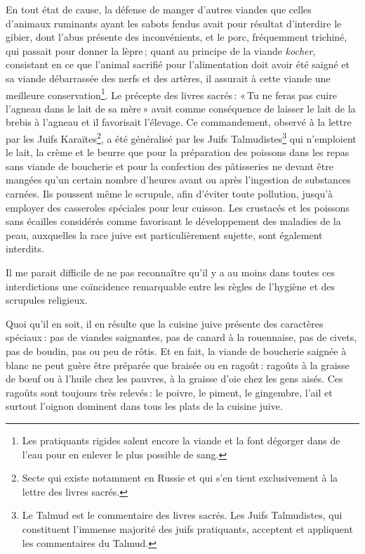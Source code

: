 En tout état de cause, la défense de manger d'autres viandes que celles
d'animaux ruminants ayant les sabots fendus avait pour résultat d'interdire le
gibier, dont l'abus présente des inconvénients, et le porc, fréquemment
trichiné, qui passait pour donner la lèpre ; quant au principe de la viande
\textit{kocher}, consistant en ce que l'animal sacrifié pour l'alimentation
doit avoir été saigné et sa viande débarrassée des nerfs et des artères, il
assurait à cette viande une meilleure conservation\footnote{Les pratiquants
rigides salent encore la viande et la font dégorger dans de l'eau pour en
enlever le plus possible de sang.}. Le précepte des livres sacrés : « Tu ne
feras pas cuire l'agneau dans le lait de sa mère » avait comme conséquence de
laisser le lait de la brebis à l'agneau et il favorisait l'élevage. Ce
commandement, observé à la lettre par les Juifs Karaïtes\footnote{Secte qui
existe notamment en Russie et qui s’en tient exclusivement à la lettre des
livres sacrés.}, a été généralisé par les Juifs Talmudistes\footnote{Le Talmud
est le commentaire des livres sacrés. Les Juifs Talmudistes, qui constituent
l'immense majorité des juifs pratiquants, acceptent et appliquent les
commentaires du Talmud.} qui n'emploient le lait, la crème et le beurre que
pour la préparation des poissons dans les repas sans viande de boucherie et
pour la confection des pâtisseries ne devant être mangées qu'un certain nombre
d'heures avant ou après l'ingestion de substances carnées. Ils poussent même le
scrupule, afin d'éviter toute pollution, jusqu'à employer des casseroles
spéciales pour leur cuisson. Les crustacés et les poissons sans écailles
considérés comme favorisant le développement des maladies de la peau,
auxquelles la race juive est particulièrement sujette, sont également
interdits.

Il me parait difficile de ne pas reconnaître qu'il y a au moins dans toutes ces
interdictions une coïncidence remarquable entre les règles de l'hygiène et des
scrupules religieux.

Quoi qu'il en soit, il en résulte que la cuisine juive présente des caractères
spéciaux : pas de viandes saignantes, pas de canard à la rouennaise, pas de
civets, pas de boudin, pas ou peu de rôtis. Et en fait, la viande de boucherie
saignée à blanc ne peut guère être préparée que braisée ou en ragoût : ragoûts
à la graisse de bœuf ou à l'huile chez les pauvres, à la graisse d’oie chez les
gens aisés. Ces ragoûts sont toujours très relevés : le poivre, le piment, le
gingembre, l'ail et surtout l'oignon dominent dans tous les plats de la cuisine
juive.

